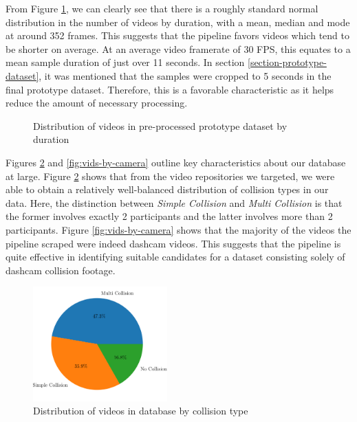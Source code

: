 \documentclass[letterpaper, 10 pt, conference]{ieeeconf}
\begin{document}
From Figure \ref{fig:vids-by-duration}, we can clearly see that there is a roughly standard normal distribution in the number of videos by duration, with a mean, median and mode at around 352 frames. This suggests that the pipeline favors videos which tend to be shorter on average. At an average video framerate of 30 FPS, this equates to a mean sample duration of just over 11 seconds. In section \ref{section-prototype-dataset}, it was mentioned that the samples were cropped to 5 seconds in the final prototype dataset. Therefore, this is a favorable characteristic as it helps reduce the amount of necessary processing.

\begin{figure}[!h]
	\centering
	\caption{Distribution of videos in pre-processed prototype dataset by duration}
	\label{fig:vids-by-duration}
\end{figure}

Figures \ref{fig:vids-by-collision} and \ref{fig:vids-by-camera} outline key characteristics about our database at large. Figure \ref{fig:vids-by-collision} shows that from the video repositories we targeted, we were able to obtain a relatively well-balanced distribution of collision types in our data. Here, the distinction between \textit{Simple Collision} and \textit{Multi Collision} is that the former involves exactly 2 participants and the latter involves more than 2 participants. Figure \ref{fig:vids-by-camera} shows that the majority of the videos the pipeline scraped were indeed dashcam videos. This suggests that the pipeline is quite effective in identifying suitable candidates for a  dataset consisting solely of dashcam collision footage.

\begin{figure}[!h]
	\centering
	\includegraphics[width=0.46\textwidth,trim={0 1cm 0 0},clip]{by-collision.png}
	\caption{Distribution of videos in database by collision type}
	\label{fig:vids-by-collision}
\end{figure}
\end{document}
